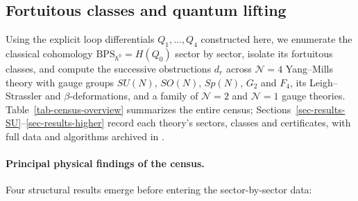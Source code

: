 \documentclass[11pt]{article}
\numberwithin{equation}{section}
\numberwithin{figure}{section}
\numberwithin{table}{section}
\begin{document}
\subsection{Fortuitous classes and quantum lifting}\label{sec-applications}

Using the explicit loop differentials $Q_1,\ldots,Q_4$ constructed here, we enumerate the classical cohomology $\mathrm{BPS}_{\hbar^0}=H(Q_0)$ sector by sector, isolate its fortuitous classes, and compute the successive obstructions $d_r$ across $\mathcal N=4$ Yang--Mills theory with gauge groups $SU(N)$, $SO(N)$, $Sp(N)$, $G_2$ and $F_4$, its Leigh--Strassler and $\beta$-deformations, and a family of $\mathcal N=2$ and $\mathcal N=1$ gauge theories. Table~\ref{tab-census-overview} summarizes the entire census; Sections~\ref{sec-results-SU}--\ref{sec-results-higher} record each theory's sectors, classes and certificates, with full data and algorithms archived in \cite{Repo}.

\paragraph{Principal physical findings of the census.}

Four structural results emerge before entering the sector-by-sector data:
\end{document}
